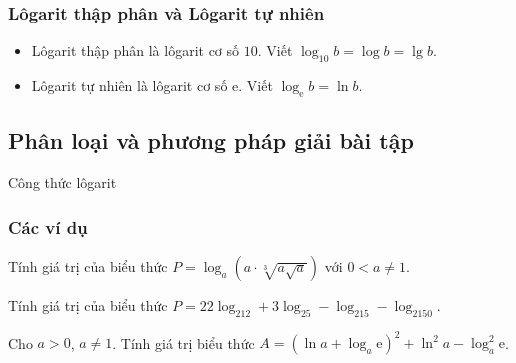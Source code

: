\subsubsection{Lôgarit thập phân và Lôgarit tự nhiên}
\begin{itemize}
	\item Lôgarit thập phân là lôgarit cơ số $10$. Viết $\log_{10}b=\log b=\lg b$.
	\item Lôgarit tự nhiên là lôgarit cơ số $\mathrm{e}$. Viết $\log_{\mathrm{e}}b=\ln b$.
\end{itemize}
\subsection{Phân loại và phương pháp giải bài tập}
\begin{dang}{Công thức lôgarit}
\end{dang}
\subsubsection{Các ví dụ}
\begin{vd}%
	Tính giá trị của biểu thức $P=\log_a\left(a\cdot\sqrt[3]{a\sqrt{a}}\right)$ với $0<a\neq 1$.
\end{vd}

\begin{vd}%
	Tính giá trị của biểu thức $P=22\log_212+3\log_25-\log_215-\log_2150$.
\end{vd}

\begin{vd}%
	Cho $a>0$, $a\neq 1$. Tính giá trị biểu thức $A=(\ln a+\log_a\mathrm{e})^2+\ln^2a-\log_a^2\mathrm{e}$.
\end{vd}

